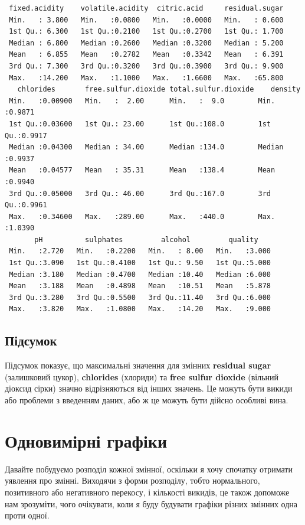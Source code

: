 \documentclass[
  letterpaper,
  DIV=11,
  numbers=noendperiod]{scrreprt}
\begin{document}
\begin{verbatim}
 fixed.acidity    volatile.acidity  citric.acid     residual.sugar  
 Min.   : 3.800   Min.   :0.0800   Min.   :0.0000   Min.   : 0.600  
 1st Qu.: 6.300   1st Qu.:0.2100   1st Qu.:0.2700   1st Qu.: 1.700  
 Median : 6.800   Median :0.2600   Median :0.3200   Median : 5.200  
 Mean   : 6.855   Mean   :0.2782   Mean   :0.3342   Mean   : 6.391  
 3rd Qu.: 7.300   3rd Qu.:0.3200   3rd Qu.:0.3900   3rd Qu.: 9.900  
 Max.   :14.200   Max.   :1.1000   Max.   :1.6600   Max.   :65.800  
   chlorides       free.sulfur.dioxide total.sulfur.dioxide    density      
 Min.   :0.00900   Min.   :  2.00      Min.   :  9.0        Min.   :0.9871  
 1st Qu.:0.03600   1st Qu.: 23.00      1st Qu.:108.0        1st Qu.:0.9917  
 Median :0.04300   Median : 34.00      Median :134.0        Median :0.9937  
 Mean   :0.04577   Mean   : 35.31      Mean   :138.4        Mean   :0.9940  
 3rd Qu.:0.05000   3rd Qu.: 46.00      3rd Qu.:167.0        3rd Qu.:0.9961  
 Max.   :0.34600   Max.   :289.00      Max.   :440.0        Max.   :1.0390  
       pH          sulphates         alcohol         quality     
 Min.   :2.720   Min.   :0.2200   Min.   : 8.00   Min.   :3.000  
 1st Qu.:3.090   1st Qu.:0.4100   1st Qu.: 9.50   1st Qu.:5.000  
 Median :3.180   Median :0.4700   Median :10.40   Median :6.000  
 Mean   :3.188   Mean   :0.4898   Mean   :10.51   Mean   :5.878  
 3rd Qu.:3.280   3rd Qu.:0.5500   3rd Qu.:11.40   3rd Qu.:6.000  
 Max.   :3.820   Max.   :1.0800   Max.   :14.20   Max.   :9.000  
\end{verbatim}

\subsection{Підсумок}\label{ux43fux456ux434ux441ux443ux43cux43eux43a}

Підсумок показує, що максимальні значення для змінних \textbf{residual
sugar} (залишковий цукор), \textbf{chlorides} (хлориди) та \textbf{free
sulfur dioxide} (вільний діоксид сірки) значно відрізняються від інших
значень. Це можуть бути викиди або проблеми з введенням даних, або ж це
можуть бути дійсно особливі вина.

\section{Одновимірні
графіки}\label{ux43eux434ux43dux43eux432ux438ux43cux456ux440ux43dux456-ux433ux440ux430ux444ux456ux43aux438}

Давайте побудуємо розподіл кожної змінної, оскільки я хочу спочатку
отримати уявлення про змінні. Виходячи з форми розподілу, тобто
нормального, позитивного або негативного перекосу, і кількості викидів,
це також допоможе нам зрозуміти, чого очікувати, коли я буду будувати
графіки різних змінних одна проти одної.
\end{document}
